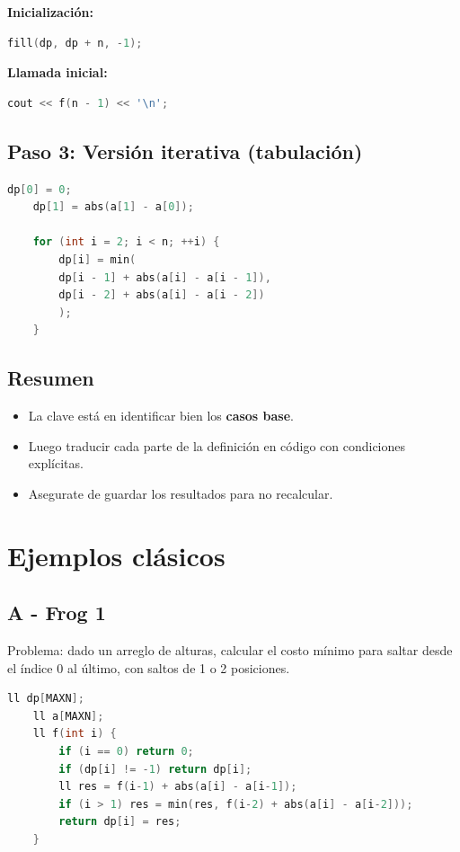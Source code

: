 \textbf{Inicialización:}

\begin{lstlisting}[language=C++]
	fill(dp, dp + n, -1);
\end{lstlisting}

\textbf{Llamada inicial:}

\begin{lstlisting}[language=C++]
	cout << f(n - 1) << '\n';
\end{lstlisting}

\subsection*{Paso 3: Versión iterativa (tabulación)}

\begin{lstlisting}[language=C++, caption=Versión iterativa (bottom-up)]
	dp[0] = 0;
	dp[1] = abs(a[1] - a[0]);
	
	for (int i = 2; i < n; ++i) {
		dp[i] = min(
		dp[i - 1] + abs(a[i] - a[i - 1]),
		dp[i - 2] + abs(a[i] - a[i - 2])
		);
	}
\end{lstlisting}

\subsection*{Resumen}

\begin{itemize}
	\item La clave está en identificar bien los \textbf{casos base}.
	\item Luego traducir cada parte de la definición en código con condiciones explícitas.
	\item Asegurate de guardar los resultados para no recalcular.
\end{itemize}


\section{Ejemplos clásicos}

\subsection{A - Frog 1}

Problema: dado un arreglo de alturas, calcular el costo mínimo para saltar desde el índice 0 al último, con saltos de 1 o 2 posiciones.

\begin{lstlisting}[language=C++, caption=Frog1: DP mínima energía]
	ll dp[MAXN];
	ll a[MAXN];
	ll f(int i) {
		if (i == 0) return 0;
		if (dp[i] != -1) return dp[i];
		ll res = f(i-1) + abs(a[i] - a[i-1]);
		if (i > 1) res = min(res, f(i-2) + abs(a[i] - a[i-2]));
		return dp[i] = res;
	}
\end{lstlisting}

